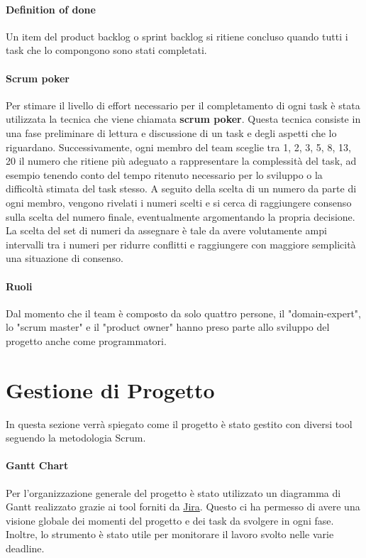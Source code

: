     \paragraph{Definition of done} Un item del product backlog o sprint backlog si ritiene concluso quando tutti i task che lo compongono sono stati completati.
    
    \paragraph{Scrum poker} Per stimare il livello di effort necessario per il completamento di ogni task è stata utilizzata la tecnica che viene chiamata \textbf{scrum poker}. Questa tecnica consiste in una fase preliminare di lettura e discussione di un task e degli aspetti che lo riguardano. Successivamente, ogni membro del team sceglie tra 1, 2, 3, 5, 8, 13, 20 il numero che ritiene più adeguato a rappresentare la complessità del task, ad esempio tenendo conto del tempo ritenuto necessario per lo sviluppo o la difficoltà stimata del task stesso. A seguito della scelta di un numero da parte di ogni membro, vengono rivelati i numeri scelti e si cerca di raggiungere consenso sulla scelta del numero finale, eventualmente argomentando la propria decisione. La scelta del set di numeri da assegnare è tale da avere volutamente ampi intervalli tra i numeri per ridurre conflitti e raggiungere con maggiore semplicità una situazione di consenso.

    \paragraph{Ruoli}
    Dal momento che il team è composto da solo quattro persone, il "domain-expert", lo "scrum master" e il "product owner" hanno preso parte allo sviluppo del progetto anche come programmatori.

\section{Gestione di Progetto}
In questa sezione verrà spiegato come il progetto è stato gestito con diversi tool seguendo la metodologia Scrum.
    \paragraph{Gantt Chart} 
    Per l'organizzazione generale del progetto è stato utilizzato un diagramma di Gantt realizzato grazie ai tool forniti da \href{https://riccardo-omiccioli.atlassian.net/jira/software/projects/IQ/boards/1/roadmap}{Jira}. Questo ci ha permesso di avere una visione globale dei momenti del progetto e dei task da svolgere in ogni fase. Inoltre, lo strumento è stato utile per monitorare il lavoro svolto nelle varie deadline. 
    
